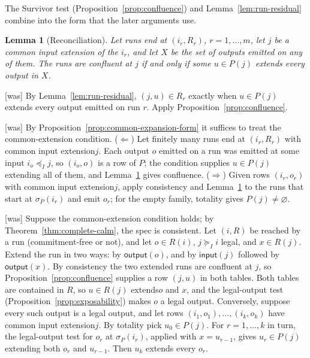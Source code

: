 \documentclass[sigconf]{cidr-2027}
\newtheorem{lemma}{Lemma}
\theoremstyle{remark}
\newcommand{\InputOrd}{\preceq_I}
\newcommand{\InputGe}{\succeq_I}
\newcommand{\commitment}{commitment\xspace}
\newcommand{\indesc}{input extension\xspace} %
\newcommand{\outrel}{extends\xspace}          %
\newcommand{\outrelpart}{extending\xspace}    %
\newcommand{\fiber}[1]{P(#1)}
\begin{document}
\color{blue!70!black}The Survivor test (Proposition~\ref{prop:confluence}) and
Lemma~\ref{lem:run-residual} combine into the form that the later arguments
use.\color{black}

\begin{lemma}[Reconciliation]
\label{lem:reconciliation}
Let runs end at $(i_r,R_r)$, $r=1,\ldots,m$, let $j$ be a common \indesc of
the $i_r$, and let $X$ be the set of outputs emitted on any of them.  The runs
are confluent at $j$ if and only if some $u\in\fiber{j}$ \outrel every output
in $X$.
\end{lemma}



{\footnotesize\color{black!50}\noindent\textsf{[was]} By Lemma~\ref{lem:run-residual}, $(j,u)\in R_r$ exactly when $u\in\fiber{j}$
\outrel every output emitted on run $r$.  Apply
Proposition~\ref{prop:confluence}.\par}



{\footnotesize\color{black!50}\noindent\textsf{[was]} By Proposition~\ref{prop:common-expansion-form} it suffices to treat the
common-extension condition.  ($\Leftarrow$) Let finitely many runs end at
$(i_r,R_r)$ with common \indesc $j$.  Each output $o$ emitted on a run was
emitted at some input $i_o\InputOrd j$, so $(i_o,o)$ is a row of $P$; the
condition supplies $u\in\fiber{j}$ \outrelpart all of them, and
Lemma~\ref{lem:reconciliation} gives confluence.  ($\Rightarrow$) Given rows
$(i_r,o_r)$ with common \indesc $j$, apply consistency and
Lemma~\ref{lem:reconciliation} to the runs that start at $\sigma_P(i_r)$ and
emit $o_r$; for the empty family, totality gives $\fiber{j}\neq\varnothing$.\par}



{\footnotesize\color{black!50}\noindent\textsf{[was]} Suppose the common-extension condition holds; by Theorem~\ref{thm:complete-calm}, the
spec is consistent.  Let $(i,R)$ be reached by a run (\commitment-free or not), and let $o\in R(i)$, $j\InputGe i$ legal, and
$x\in R(j)$.  Extend the run in two ways: by $\mathsf{output}(o)$, and by
$\mathsf{input}(j)$ followed by $\mathsf{output}(x)$.
By consistency the two extended runs are confluent at $j$, so
Proposition~\ref{prop:confluence} supplies a row $(j,u)$ in both tables.  Both
tables are contained in $R$, so $u\in R(j)$ \outrel $o$ and $x$, and the legal-output test
(Proposition~\ref{prop:exposability}) makes $o$ a legal output.
Conversely, suppose every such output is a legal output, and let rows
$(i_1,o_1),\ldots,(i_k,o_k)$ have common \indesc $j$.  By totality pick
$u_0\in P(j)$.  For $r=1,\ldots,k$ in turn, the legal-output test for $o_r$ at
$\sigma_P(i_r)$, applied with $x=u_{r-1}$, gives $u_r\in P(j)$ \outrelpart both
$o_r$ and $u_{r-1}$.  Then $u_k$ \outrel every $o_r$.\par}
\end{document}
